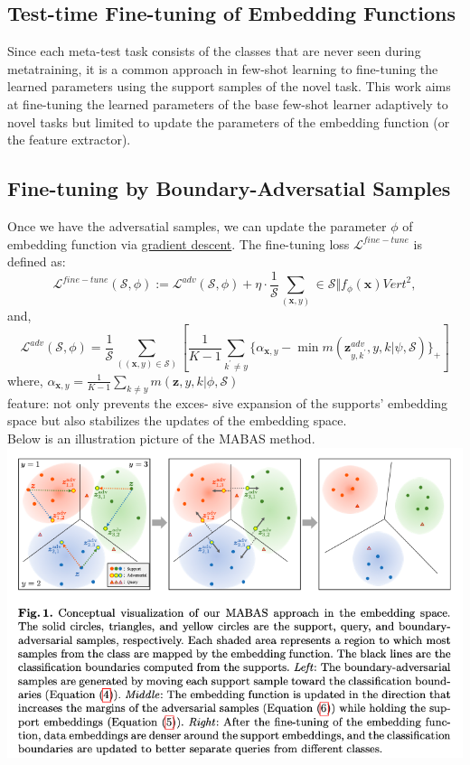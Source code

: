 \documentclass{article}
\begin{document}
\subsection{Test-time Fine-tuning of Embedding Functions}
Since each meta-test task consists of the classes that are never seen during metatraining, 
it is a common approach in few-shot learning to fine-tuning the learned parameters using the
support samples of the novel task. This work aims at fine-tuning the learned parameters of the
base few-shot learner adaptively to novel tasks but limited to update the parameters of the
embedding function (or the feature extractor). 
\subsection{Fine-tuning by Boundary-Adversatial Samples}
Once we have the adversatial samples, we can update the parameter $\phi$ of embedding function via \underline{gradient descent}. The fine-tuning loss $\mathcal{L}^{fine-tune}$ is defined as: \\
$$
\mathcal{L}^{fine-tune}(\mathcal{S}, \phi) := \mathcal{L}^{adv}(\mathcal{S}, \phi) + \eta \cdot \frac{1}{\mathcal{S}}\sum_{(\textbf{x},y)}\in\mathcal{S}{\Vert}f_{\phi}(\textbf{x}){Vert}^2,
$$
and, 
$$
\mathcal{L}^{adv}(\mathcal{S}, \phi) = 
\frac{1}{\mathcal{S}} 
\sum_((\textbf{x}, y) \in \mathcal{S})[
    \frac{1}{K - 1} \sum_{k^{\prime} \neq y} 
        \{\alpha_{\textbf{x},y} - 
        \min{
            m(\textbf{z}_{y, k^{\prime}}^{adv}, y, k | \psi, \mathcal{S})
            } 
        \}_+
    ]
$$
where,
$
\alpha_{\textbf{x}, y} =
\frac{1}{K - 1} 
\sum_{k \neq y} 
m 
(\textbf{z}, y, k 
|
\phi,
\mathcal{S}
)
$
\\
feature: not only prevents the exces- sive expansion 
of the supports’ embedding space but also stabilizes 
the updates of the embedding space.\\
Below is an illustration picture of the MABAS method.\\
\includegraphics[scale=0.6]{src/img/MABAS Illustration.jpg}\\
\end{document}
